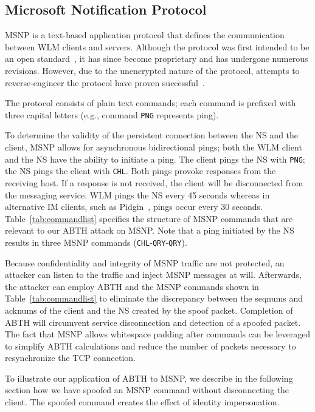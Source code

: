 \documentclass{sig-alternate}
\begin{document}
\subsection{Microsoft Notification Protocol}

MSNP is a text-based application protocol that defines the communication between WLM clients and servers.
Although the protocol was first intended to be an open standard~\cite{fout:insidewlm}, it has since become proprietary and has undergone numerous revisions.
However, due to the unencrypted nature of the protocol, attempts to reverse-engineer the protocol have proven successful~\cite{hypothetic:msnp, msnfanatic:msnp}.

The protocol consists of plain text commands; each command is prefixed with three capital letters (e.g., command \texttt{PNG} represents ping).

To determine the validity of the persistent connection between the NS and the client, MSNP allows for asynchronous bidirectional pings; both the WLM client and the NS have the ability to initiate a ping.
The client pings the NS with \texttt{PNG}; the NS pings the client with \texttt{CHL}.
Both pings provoke responses from the receiving host. 
If a response is not received, the client will be disconnected from the messaging service.
WLM pings the NS every 45 seconds whereas in alternative IM clients, such as Pidgin~\cite{pidgin:url}, pings occur every 30 seconds.
Table~\ref{tab:commandlist} specifies the structure of MSNP commands that are relevant to our ABTH attack on MSNP.
Note that a ping initiated by the NS results in three MSNP commands (\texttt{CHL}-\texttt{QRY}-\texttt{QRY}).

Because confidentiality and integrity of MSNP traffic are not protected, an attacker can listen to the traffic and inject MSNP messages at will.
Afterwards, the attacker can employ ABTH and the MSNP commands shown in Table~\ref{tab:commandlist} to eliminate the discrepancy between the seqnums and acknums of the client and the NS created by the spoof packet.
Completion of ABTH will circumvent service disconnection and detection of a spoofed packet.
The fact that MSNP allows whitespace padding after commands can be leveraged to simplify ABTH calculations and reduce the number of packets necessary to resynchronize the TCP connection.

To illustrate our application of ABTH to MSNP, we describe in the following section how we have spoofed an MSNP command without disconnecting the client.
The spoofed command creates the effect of identity impersonation.
\end{document}
